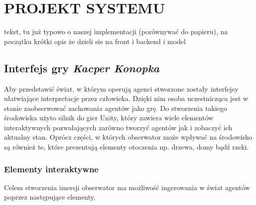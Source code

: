 \chapter{PROJEKT SYSTEMU}

tekst, tu już typowo o naszej implementacji (porównywać do papieru), na początku krótki opis że dzieli sie na front i backend i model


\section{Interfejs gry \textit{Kacper Konopka}}

Aby przedstawić świat, w którym operują agenci stworzone zostały interfejsy ułatwiające interpretacje przez człowieka. Dzięki nim osoba uczestnicząca jest w stanie zaobserwować zachowania agentów jako grę. Do stworzenia takiego środowiska użyto silnik do gier Unity, który zawiera wiele elementów interaktywnych pozwalających zarówno tworzyć agentów jak i zobaczyć ich aktualny stan. Oprócz części, w których obserwator może wpływać na środowisko są również te, które prezentują elementy otoczenia np. drzewa, domy bądź rzeki.

\subsection{Elementy interaktywne}
Celem stworzenia imersji obserwator ma możliwość ingerowania w świat agentów poprzez następujące elementy.
